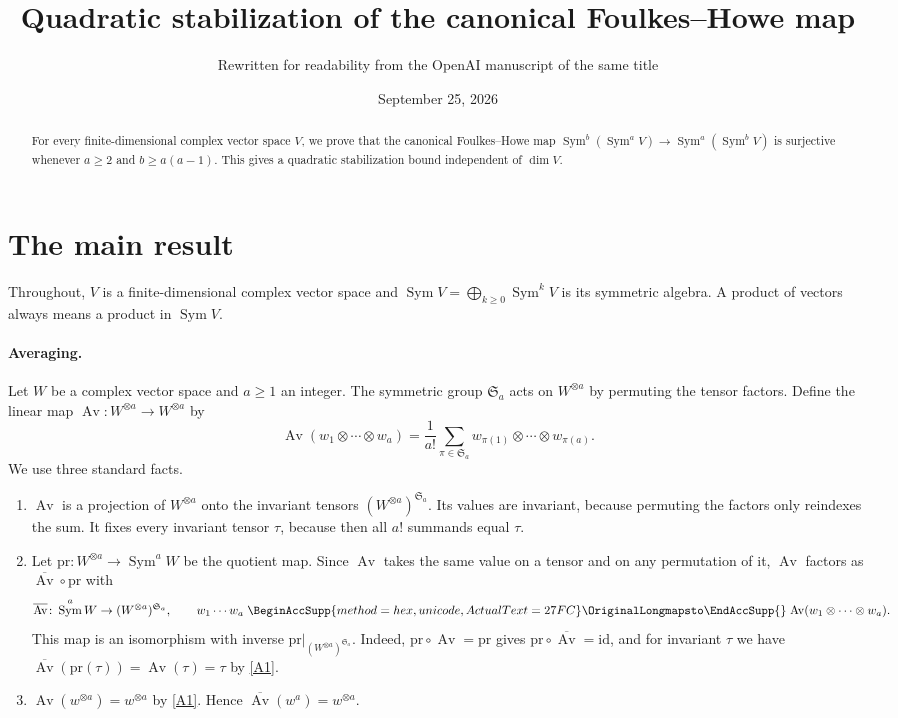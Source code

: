 \documentclass[11pt]{article}
\title{Quadratic stabilization of the canonical Foulkes--Howe map}
\author{Rewritten for readability from the OpenAI manuscript of the same title}
\date{September 25, 2026}
\renewcommand{\longmapsto}{\mathrel{
  \BeginAccSupp{method=hex,unicode,ActualText=27FC}
  \OriginalLongmapsto\EndAccSupp{}}}
\theoremstyle{remark}
\DeclareMathOperator{\Sym}{Sym}
\DeclareMathOperator{\Av}{Av}
\newcommand{\Sa}{\mathfrak S_a}
\begin{document}
\maketitle
\begin{abstract}
For every finite-dimensional complex vector space $V$, we prove that the
canonical Foulkes--Howe map
$\Sym^b(\Sym^a V)\longrightarrow\Sym^a(\Sym^b V)$ is surjective whenever
$a\ge2$ and $b\ge a(a-1)$. This gives a quadratic stabilization bound
independent of $\dim V$.
\end{abstract}

\section{The main result}\label{sec:introduction}

Throughout, $V$ is a finite-dimensional complex vector space and
$\Sym V=\bigoplus_{k\ge0}\Sym^kV$ is its symmetric algebra. A product of
vectors always means a product in $\Sym V$.

\paragraph{Averaging.}
Let $W$ be a complex vector space and $a\ge1$ an integer. The symmetric
group $\Sa$ acts on $W^{\otimes a}$ by permuting the tensor factors. Define
the linear map $\Av\colon W^{\otimes a}\to W^{\otimes a}$ by
\begin{equation}\label{eq:average}
 \Av(w_1\otimes\cdots\otimes w_a)
 =\frac1{a!}\sum_{\pi\in\Sa}
 w_{\pi(1)}\otimes\cdots\otimes w_{\pi(a)}.
\end{equation}
We use three standard facts.
\begin{enumerate}[label=(A\arabic*),leftmargin=3.2em]
\item\label{A1} $\Av$ is a projection of $W^{\otimes a}$ onto the invariant
 tensors $(W^{\otimes a})^{\Sa}$. Its values are invariant, because
 permuting the factors only reindexes the sum. It fixes every invariant
 tensor $\tau$, because then all $a!$ summands equal $\tau$.
\item\label{A2} Let $\mathrm{pr}\colon W^{\otimes a}\to\Sym^aW$ be the
 quotient map. Since $\Av$ takes the same value on a tensor and on any
 permutation of it, $\Av$ factors as $\overline{\Av}\circ\mathrm{pr}$ with
 \[
 \overline{\Av}\colon\Sym^aW\to(W^{\otimes a})^{\Sa},\qquad
 w_1\cdots w_a\longmapsto\Av(w_1\otimes\cdots\otimes w_a).
 \]
 This map is an isomorphism with inverse $\mathrm{pr}|_{(W^{\otimes a})^{\Sa}}$.
 Indeed, $\mathrm{pr}\circ\Av=\mathrm{pr}$ gives
 $\mathrm{pr}\circ\overline{\Av}=\mathrm{id}$, and for invariant $\tau$ we
 have $\overline{\Av}(\mathrm{pr}(\tau))=\Av(\tau)=\tau$ by \ref{A1}.
\item\label{A3} $\Av(w^{\otimes a})=w^{\otimes a}$ by \ref{A1}. Hence
 $\overline{\Av}(w^a)=w^{\otimes a}$.
\end{enumerate}
\end{document}

